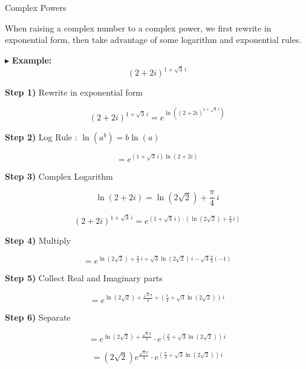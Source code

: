 \documentclass{ximera}
\begin{document}
\begin{procedure} Complex Powers


When raising a complex number to a complex power, we first rewrite in exponential form, then take advantage of some logarithm and exponential rules.


$\blacktriangleright$ \textbf{Example:}  
\[  (2+2i)^{1+\sqrt{3} \, i}    \]


\textbf{\textcolor{blue!75!black}{Step 1)}}  Rewrite in exponential form 




\[  (2+2i)^{1+\sqrt{3} \, i}   =        e^{\ln\left( (2+2i)^{1+\sqrt{3} \, i} \right)} \]




\textbf{\textcolor{blue!75!black}{Step 2)}}  Log Rule : $\ln(a^b) = b \ln(a)$ 


\[   =        e^{(1+\sqrt{3} \, i) \ln(2+2i)} \]




\textbf{\textcolor{blue!75!black}{Step 3)}}  Complex Logarithm 


\[   \ln(2+2i) = \ln(2\sqrt{2}) + \frac{\pi}{4} \, i \]



\[   (2+2i)^{1+\sqrt{3} \, i}   =       e^{(1+\sqrt{3} \, i) \cdot (\ln(2\sqrt{2}) + \frac{\pi}{4} \, i)} \]






\textbf{\textcolor{blue!75!black}{Step 4)}}  Multiply 



\[
=    e^{   \ln(2\sqrt{2}) +   \frac{\pi}{4} \, i     +  \sqrt{3} \ln(2\sqrt{2}) \, i - \sqrt{3}  \frac{\pi}{4} (-1) }
\]



\textbf{\textcolor{blue!75!black}{Step 5)}}  Collect Real and Imaginary parts 



\[
=   e^{   \ln(2\sqrt{2}) + \frac{\sqrt{3}\pi}{4} +  (\frac{\pi}{4} + \sqrt{3} \ln(2\sqrt{2}) )  \, i   }
\]




\textbf{\textcolor{blue!75!black}{Step 6)}}  Separate 


\[
=   e^{   \ln(2\sqrt{2}) + \frac{\sqrt{3}\pi}{4}} \cdot  e^{(\frac{\pi}{4} + \sqrt{3} \ln(2\sqrt{2}) )  \, i}
\]





\[
=   (2\sqrt{2})  e^{\frac{\sqrt{3}\pi}{4}} \cdot  e^{(\frac{\pi}{4} + \sqrt{3} \ln(2\sqrt{2}) )  \, i}
\]





\end{procedure}
\end{document}
